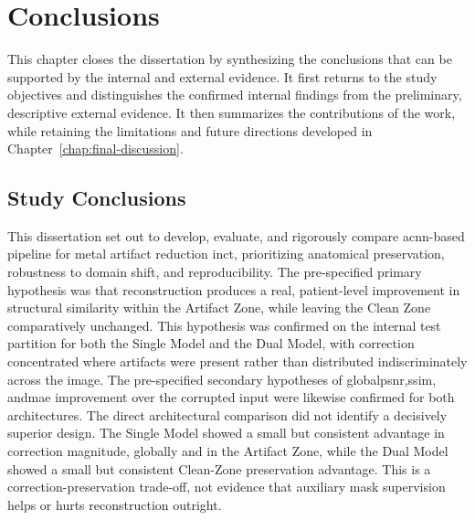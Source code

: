 \chapter{Conclusions}
\label{chap:final-conclusions}

This chapter closes the dissertation by synthesizing the conclusions that can be supported by the internal and external evidence. It first returns to the study objectives and distinguishes the confirmed internal findings from the preliminary, descriptive external evidence. It then summarizes the contributions of the work, while retaining the limitations and future directions developed in Chapter~\ref{chap:final-discussion}.

\section{Study Conclusions}

This dissertation set out to develop, evaluate, and rigorously compare a\acrshort{cnn}-based pipeline for metal artifact reduction in\acrshort{ct}, prioritizing anatomical preservation, robustness to domain shift, and reproducibility. The pre-specified primary hypothesis was that reconstruction produces a real, patient-level improvement in structural similarity within the Artifact Zone, while leaving the Clean Zone comparatively unchanged. This hypothesis was confirmed on the internal test partition for both the Single Model and the Dual Model, with correction concentrated where artifacts were present rather than distributed indiscriminately across the image. The pre-specified secondary hypotheses of global\acrshort{psnr},\acrshort{ssim}, and\acrshort{mae} improvement over the corrupted input were likewise confirmed for both architectures. The direct architectural comparison did not identify a decisively superior design. The Single Model showed a small but consistent advantage in correction magnitude, globally and in the Artifact Zone, while the Dual Model showed a small but consistent Clean-Zone preservation advantage. This is a correction-preservation trade-off, not evidence that auxiliary mask supervision helps or hurts reconstruction outright.

